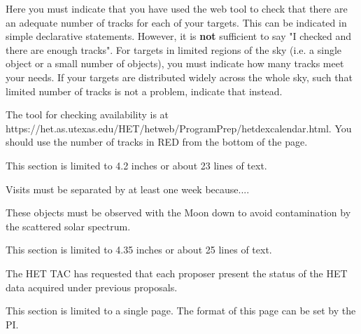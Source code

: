 \documentclass[11pt]{article}
\begin{document}
%
%

\BeginDescribeTracks
Here you must indicate that you have used the web tool to check that
there are an adequate number of tracks for each of your targets.
This can be indicated in simple declarative statements.  However, it is
{\bf not} sufficient to say "I checked and there are enough tracks".
For targets in limited regions of the sky (i.e. a single object
or a small number of objects), you must indicate how many tracks meet
your needs.  If your targets are distributed widely across the whole
sky, such that limited number of tracks is not a problem, indicate that
instead.

The tool for checking availability is at \\
https://het.as.utexas.edu/HET/hetweb/ProgramPrep/hetdexcalendar.html. 
You should use the number of tracks in RED from the bottom of the page.

This section is limited to 4.2 inches or about 23 lines of text.

\EndDescribeTracks

%
%
%
\BeginJustifyConstraints

  Visits must be separated by at least one week because....
  
  These objects must be observed with the Moon down to avoid contamination
  by the scattered solar spectrum.

This section is limited to 4.35 inches or about 25 lines of text.

\EndJustifyConstraints



%
%
%
%
\BeginPreviousTime

The HET TAC has requested that each proposer present the status of 
the HET data acquired under previous proposals.

This section is limited to a single page.
The format of this page can be set by the PI.


\EndPreviousTime
\end{document}
